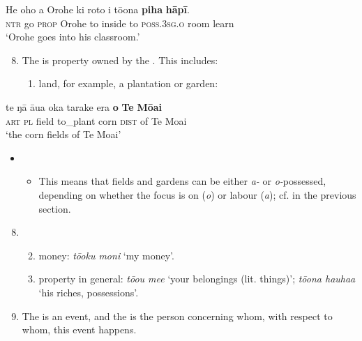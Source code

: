 \ea\label{ex:6.90}
\gll He oho a {\ꞌ}Orohe ki roto i tō{\ꞌ}ona \textbf{piha} \textbf{hāpī}. \\
\textsc{ntr} go \textsc{prop} Orohe to inside to \textsc{poss.3sg.o} room learn \\

\glt
‘Orohe goes into his classroom.’ \textstyleExampleref{[R334.027]} 
\z

\begin{enumerate}
\setcounter{enumi}{7}
\item 
The  is property owned by the . This includes:

\begin{enumerate}
\item 
land, for example, a plantation or garden:

\end{enumerate}
\end{enumerate}

\ea\label{ex:6.91}
\gll te ŋā {\ꞌ}āua {\ꞌ}oka tarake era \textbf{o} \textbf{Te} \textbf{Mōai} \\
\textsc{art} \textsc{pl} field to\_plant corn \textsc{dist} of Te Moai \\

\glt
‘the corn fields of Te Moai’ \textstyleExampleref{[R539-2.154]}
\z

\begin{itemize}
\item[]
\begin{itemize}
\item[]
This means that fields and gardens can be either \textit{a-} or \textit{o-}possessed, depending on whether the focus is on  (\textit{o}) or labour (\textit{{\ꞌ}a}); cf.  in the previous section. 
\end{itemize}
\end{itemize}

\begin{enumerate}
\setcounter{enumi}{7}
\item[]
\begin{enumerate}
\setcounter{enumii}{1}
\item 
money: \textit{tō{\ꞌ}oku moni} ‘my money’.

\item 
property in general: \textit{tō{\ꞌ}ou me{\ꞌ}e} ‘your belongings (lit. things)’; \textit{tō{\ꞌ}ona hauha{\ꞌ}a} ‘his riches, possessions’.

\end{enumerate}
\setcounter{enumi}{8}
\item 
The  is an event, and the  is the person concerning whom, with respect to whom, this event happens.

\end{enumerate}

